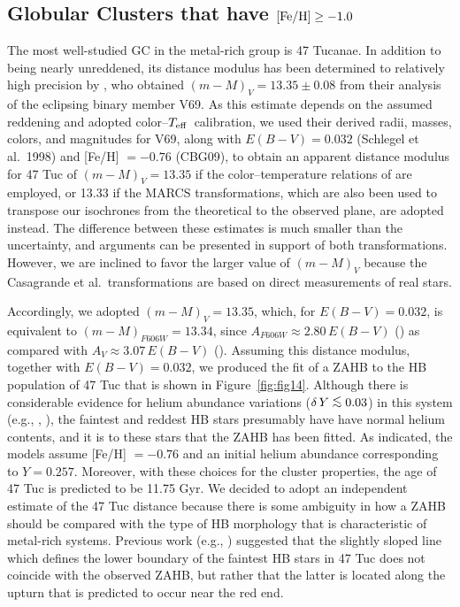\documentclass[12pt,preprint]{aastex}
\newcommand\teff{{T_{\rm eff}}}
\newcommand\lta{\mathrel{\hbox{\raise 0.6 ex \hbox{$<$}\kern
                   -1.8 ex\lower .5 ex\hbox{$\sim$}}}}
\begin{document}
\subsection{Globular Clusters that have ${\rm [Fe/H]} \ge -1.0$}
\label{subsec:mrich}

The most well-studied GC in the metal-rich group is 47 Tucanae.  In addition to
being nearly unreddened, its distance modulus has been determined to relatively
high precision by \citet{tkr10}, who obtained $(m-M)_V = 13.35 \pm 0.08$ from
their analysis of the eclipsing binary member V69.  As this estimate depends on
the assumed reddening and adopted color--$\teff$\ calibration, we used their
derived radii, masses, colors, and magnitudes for V69, along with $E(B-V) =
0.032$ (Schlegel et al.~1998) and [Fe/H] $= -0.76$ (CBG09), to obtain an
apparent distance modulus for 47 Tuc of $(m-M)_V = 13.35$ if the
color--temperature relations of \citet{crm10} are employed, or 13.33 if the
MARCS transformations, which are also been used to transpose
our isochrones from the theoretical to the observed plane, are adopted instead.
The difference between these estimates is much smaller than the uncertainty,
and arguments can be presented in support of both transformations.  However, we
are inclined to favor the larger value of $(m-M)_V$ because the Casagrande et
al.~transformations are based on direct measurements of real stars.

Accordingly, we adopted $(m-M)_V = 13.35$, which, for $E(B-V) = 0.032$, is
equivalent to $(m-M)_{F606W} = 13.34$, since $A_{F606W} \approx 2.80\,E(B-V)$
(\citealt{sjb05}) as compared with $A_V \approx 3.07\,E(B-V)$ (\citealt{mcc04}).
Assuming this distance modulus, together with $E(B-V) = 0.032$, we produced the
fit of a ZAHB to the HB population of 47 Tuc that is shown in
Figure~\ref{fig:fig14}.  Although there is considerable evidence for helium
abundance variations ($\delta\,Y \lta 0.03$) in this system (e.g.,
\citealt{ngp11}, \citealt{gls13}), the faintest and reddest HB stars
presumably have have normal helium contents, and it is to these stars that the
ZAHB has been fitted.  As indicated, the models assume [Fe/H] $= -0.76$ and
an initial helium abundance corresponding to $Y = 0.257$.  Moreover, with these
choices for the cluster properties, the age of 47 Tuc is predicted to be 11.75
Gyr.  We decided to adopt an independent estimate of the 47 Tuc distance because
there is some ambiguity in how a ZAHB should be compared with the type of HB
morphology that is characteristic of metal-rich systems.  Previous work (e.g.,
\citealt{dvl89}) suggested that the slightly sloped line which defines the
lower boundary of the faintest HB stars in 47 Tuc does not coincide with the
observed ZAHB, but rather that the latter is located along the upturn that is
predicted to occur near the red end.
\end{document}
